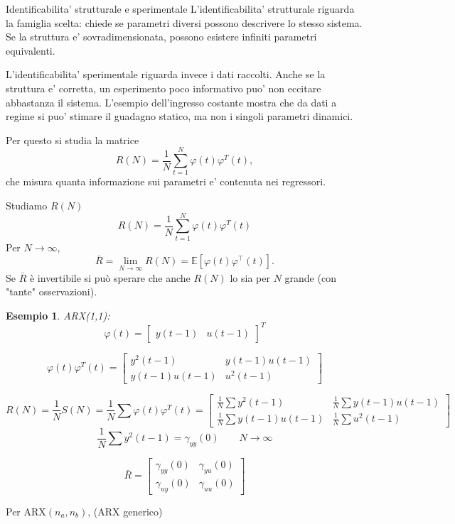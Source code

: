 \documentclass[11pt,a4paper]{article}
\newtheorem{example}{Esempio}
\begin{document}
\begin{spiegazione}{Identificabilita' strutturale e sperimentale}
L'identificabilita' strutturale riguarda la famiglia scelta: chiede se parametri diversi possono descrivere lo stesso sistema. Se la struttura e' sovradimensionata, possono esistere infiniti parametri equivalenti.

L'identificabilita' sperimentale riguarda invece i dati raccolti. Anche se la struttura e' corretta, un esperimento poco informativo puo' non eccitare abbastanza il sistema. L'esempio dell'ingresso costante mostra che da dati a regime si puo' stimare il guadagno statico, ma non i singoli parametri dinamici.

Per questo si studia la matrice
\[
R(N)=\frac{1}{N}\sum_{t=1}^{N}\varphi(t)\varphi^T(t),
\]
che misura quanta informazione sui parametri e' contenuta nei regressori.
\end{spiegazione}

Studiamo $R(N)$
\[
R(N) = \frac{1}{N}\sum_{t=1}^{N}\varphi(t)\varphi^T(t)
\]
 Per $N\to\infty$,
\[
\bar R=\lim_{N\to\infty} R(N)=\mathbb{E}[\varphi(t)\varphi^{\top}(t)].
\]
Se $\bar R$ è invertibile si può sperare che anche $R(N)$ lo sia per $N$ grande (con "tante" osservazioni). 

\begin{example}
 ARX(1,1): 
  \[ 
    \varphi(t)=
\begin{bmatrix}
y(t-1) & u(t-1)
\end{bmatrix}^{T}
\]

\[
\varphi(t)\varphi^{T}(t)=
\begin{bmatrix}
y^2(t-1) & y(t-1)u(t-1)\\
y(t-1)u(t-1) & u^2(t-1)
\end{bmatrix}
\]

\[
R(N)=\frac{1}{N}S(N)=\frac{1}{N}\sum \varphi(t)\varphi^{T}(t)
=
\begin{bmatrix}
\frac{1}{N}\sum y^2(t-1) & \frac{1}{N}\sum y(t-1)u(t-1)\\[0.6em]
\frac{1}{N}\sum y(t-1)u(t-1) & \frac{1}{N}\sum u^2(t-1)
\end{bmatrix}
\]
\[
\frac{1}{N}\sum y^2(t-1)
=
\gamma_{yy}(0)
\qquad
N\to\infty
\]

\[
\bar R=
\begin{bmatrix}
\gamma_{yy}(0) & \gamma_{yu}(0)\\
\gamma_{uy}(0) & \gamma_{uu}(0)
\end{bmatrix}
\]

\end{example}
Per ARX$(n_a,n_b)$, (ARX generico)
\end{document}

